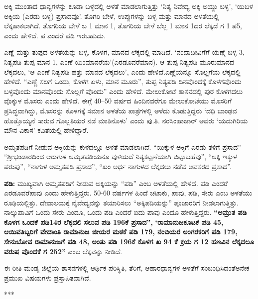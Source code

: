 ಅಕ್ಕಿ ಮುಂತಾದ ಧಾನ್ಯಗಳನ್ನು ಕೂಡಾ ಬಳ್ಳದಲ್ಲಿ ಅಳತೆ ಮಾಡಲಾಗುತ್ತಿತ್ತು ‘ನಿತ್ಯ ನಿವೇದ್ಯ ಅಕ್ಕಿ ಅಯ್ದು ಬಳ್ಳ’, ‘ಯಿಬಳ ಅಕ್ಕಿಯ (ಎರಡು ಬಳ್ಳ) ಪ್ರಸಾದವೂ’. ತೊಗರಿ ಬೇಳೆ, ಉಪ್ಪುಗಳನ್ನು ಬಳ್ಳ ಮತ್ತು ಮಾನದ ಅಳತೆಯಲ್ಲಿ ಲೆಕ್ಕಹಾಕಲಾಗಿದೆ. ತೊಗರಿಯ ಬೇಳೆ ಬ 1 ಮಾನ 1, ತೊಗರಿಯ ಬೇಳೆ ಬೆಲ್ಲ 1 ಮಾನ 1ದರ ಲೆಕ್ಕದೆ ಗ 1 ಪ5, ಎಂದು ಹೇಳಿದೆ. ಪ ಎಂದರೆ ಪಡಿ ಇರಬಹುದು.

ಎಣ್ಣೆ ಮತ್ತು ತುಪ್ಪದ ಅಳತೆಯನ್ನು ಬಳ್ಳ, ಕೊಳಗ, ಮಾನದ ಲೆಕ್ಕದಲ್ಲಿ ಮಾಡಿದೆ. ‘ನಂದಾದೀವಿಗೆಗೆ ಯೆಣ್ನೆ ಬಳ್ಳ 3, ನಿತ್ಯಪಡಿ ತುಪ್ಪ ಮಾನ 1, ಎಂಣೆ ಯಿಂಮಾನರೆಯ’(ಎರಡೂವರೆಮಾನ). ಆ ತುಪ್ಪ ನಿತ್ಯಪಡಿ ಮೂರುಮಾನದ ಲೆಕ್ಕದಲು, ‘ಆ ಎಂಣೆ ನಿತ್ಯಪಡಿ ಹತ್ತು ಮಾನದ ಲೆಕ್ಕದಲು’, ಎಂದು ಹೇಳಿದೆ.ಎಣ್ಣೆಯನ್ನೂ ಸೊಲ್ಲಗೆಯ ಲೆಕ್ಕದಲ್ಲಿ ಹೇಳಿದೆ. “ಎಣ್ಣೆ ಸಲಗೆ ಒಂದು, ಕೊಳಗ ಏಳು, ಮಾನ ಮೂರು”, ತುಪ್ಪ ನಿತ್ಯಪಡಿ ದಿನವೊಂದಕ್ಕೆ ಕೊಳಗವೊಂದು ಬಳ್ಳವೊಂದು ಮಾನವೊಂದು ಸೊಲ್ಲಗೆ ವೊಂದು” ಎಂದು ಹೇಳಿದೆ. ಮೇಲುಕೋಟೆ ಶಾಸನದಲ್ಲಿ ಪುರ ಕೊಳಗದಲು ವೊಕ್ಕುಳ ಮೊಸರು ಎಂದು ಹೇಳಿದೆ. ಈಗ್ಗೆ 40–50 ವರ್ಷದ ಹಿಂದಿನವರೆಗೂ ಮೇಲುಕೋಟೆಯು ಮೊಸರಿಗೆ ಪ್ರಸಿದ್ಧವಾಗಿದ್ದು, ಮೊಸರನ್ನು ಕೊಳಗಕ್ಕೆ ಸಮಾನ ಅಳತೆಯ ಪಾತ್ರೆಗಳಲ್ಲಿ ಅಳೆದು ಕೊಡುತ್ತಿದ್ದರು ‘ದಧಿ ಬಾಂಢವ ಹೊತ್ತೊಯ್ಯನೆ ಸಾರುವ ಗೊಲ್ಲತಿಯರ ನಡೆ ಮಾತಿನೊಳು’ ಎಂದು ಪು.ತಿ. ನರಸಿಂಹಾಚಾರ್ ಅವರು ‘ಯದುಗಿರಿಯ ಮೌನ ವಿಕಾಸ’ ಕವಿತೆಯಲ್ಲಿ ಹೇಳಿದ್ದಾರೆ.

ಅಮೃತಪಡಿಗೆ ನೀಡುವ ಅಕ್ಕಿಯನ್ನು ಕುಳದಲ್ಲೂ ಅಳತೆ ಮಾಡಲಾಗಿದೆ. “ಯಿಕ್ಕುಳ ಅಕ್ಕಿಗೆ ಎರಡು ತಳಿಗೆ ಪ್ರಸಾದ” “ಶ‍್ರೀಭಂಡಾರದಿಂದ ಆರುಗುಳ ಅಮೃತಪಡಿಯನೂ ವುಳಿಯದೆ ನಿತ್ಯಕಟ್ಟಣೆಯಾಗಿ ಬಿಟ್ಟುಬಹೆವು”, “ಅಕ್ಕಿ ಇಕ್ಕುಳ ಪರುಪು”, “ನಾಗುಳ ಅಮೃತಪಡಿ ಪ್ರಸಾದ”, “ಖಂ ಅರ್ಧ ನಾಗುಳದ ಲೆಕ್ಕದಲು ನಡೆವ ಅವಸರದ ಪ್ರಸಾದ”.

\textbf{ಪಡಿ:} ಮುಖ್ಯವಾಗಿ ಅಮೃತಪಡಿಗೆ ನೀಡುವ ಅಕ್ಕಿಯನ್ನು “ಪಡಿ” ಎಂಬ ಅಳತೆಯಲ್ಲಿ ಹೇಳಿದೆ. ಪಡಿ ಎಂದರೆ ಎರಡೂವರೆಪಾವು ಎಂದು ಹೇಳುತ್ತಿದ್ದರು. 50-60 ವರ್ಷಗಳ ಹಿಂದೆ ಚಟಾಕು, ಪಾವು, ಪಡಿ, ಸೇರು ಎಂಬ ಅಳತೆಯು ರೂಢಿಯಲ್ಲಿತ್ತು. ದೇವಾಲಯಕ್ಕೆ ನೈವೇದ್ಯವನ್ನು ತಯಾರಿಸಲು “ಅಕ್ಕಿಪಡಿಯನ್ನು” ಪೂಜಾರರಿಗೆ ನೀಡಲಾಗುತ್ತಿತ್ತು. ನಾಲ್ಕುಪಾವಿಗೆ ಒಂದು ಸೇರು ಎಂದೂ, ಒಂದು ಪಡಿ ಎಂದರೆ ಐದು ಪಾವು ಎಂದೂ ಹೇಳುತ್ತಿದ್ದರು. \textbf{“ಅಮ್ರುತ ಪಡಿ ಕೊಳಗ ಒಂದಕೆ ಪಡಿ14ರ ಲೆಕ್ಕದಲಿ ಸಲುವ ಪಡಿ 196ಕೆ ಪ್ರಸಾದ”,} \textbf{‘ರಾಮಾನುಜಕೂಟಕೆ ಪಡಿ 45, ಆಯಿವತಿಬ್ಬರಿಗೆ ವೇದಾಂತಿ ರಾಮಾನುಜ ಜೀಯರ ಮಠಕೆ ಪಡಿ 179, ನಂಬಿಯರ ಅಂಗರಕರಿಗೆ ಪಡಿ 179, ಸೇನುಬೋವ ರಾಮಾನುಜಗೆ ಪಡಿ 48, ಅಂತು ಪಡಿ 196ಕೆ ಕೊಳಗ ಖ 94 ಕೆ ಕ್ರಯ ಗ 12 ಹಣವಿನ ಲೆಕ್ಕದಲೂ ವರುಷ ವೊಂದಕೆ ಗ 252”} ಎಂಬ ಲೆಕ್ಕವನ್ನು ನೀಡಿದೆ.

\newpage

ಈ ರೀತಿ ಮಂಡ್ಯ ಜಿಲ್ಲೆಯ ಶಾಸನಗಳಲ್ಲಿ ಆರ್ಥಿಕ ಪರಿಸ್ಥಿತಿ, ತೆರಿಗೆ, ಆಹಾರಧಾನ್ಯಗಳ ಅಳತೆಗೆ ಸಂಬಂಧಿಸಿದಂತೆ\break ಅನೇಕ ಪ್ರಮುಖ ವಿಷಯಗಳು ಪ್ರಸ್ತಾಪಿತವಾಗಿವೆ.

\begin{center}
***
\end{center}

\theendnotes
